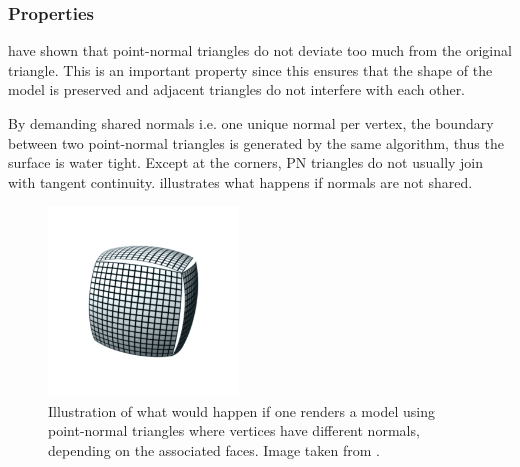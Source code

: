 \subsubsection{Properties}
\label{sss:method:geometric:properties}
\citeauthor{vlachos2001curved} have shown that point-normal triangles do not deviate too much from the original triangle. This is an important property since this ensures that the shape of the model is preserved and adjacent triangles do not interfere with each other. 

By demanding shared normals i.e. one unique normal per vertex, the boundary between two point-normal triangles is generated by the same algorithm, thus the surface is water tight. Except at the corners, PN triangles do not usually join with tangent continuity.  illustrates what happens if normals are not shared.

\begin{figure}
	\centering
	\includegraphics[width=0.45\textwidth]{./content/img/method/cracks.png}
	\caption{Illustration of what would happen if one renders a model using point-normal triangles where vertices have different normals, depending on the associated faces. Image taken from \cite{mcdonald2010crack}.}
	\label{fig:method:cracks}
\end{figure}